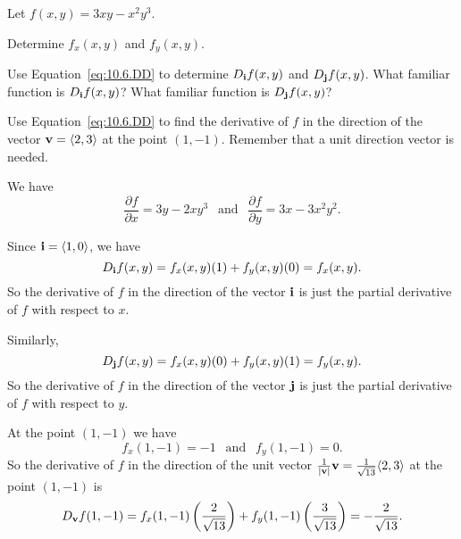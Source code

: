 \begin{activity} \label{A:10.6.2} Let $f(x,y) = 3xy-x^2y^3$.
	\ba
	
	\item Determine $f_x(x,y)$ and $f_y(x,y)$.
		
	\item Use Equation~\eqref{eq:10.6.DD} to determine $D_{\mathbf{i}} f(x,y)$ and $D_{\mathbf{j}} f(x,y)$. What familiar function is $D_{\mathbf{i}} f(x,y)$? What familiar function is $D_{\mathbf{j}} f(x,y)$?
	
	\item Use Equation~\eqref{eq:10.6.DD} to find the derivative of $f$ in the direction of the vector $\mathbf{v} = \langle 2, 3 \rangle$ at the point $(1,-1)$.  Remember that a unit direction vector is needed.
	
	
	
	\ea


\end{activity}
\begin{smallhint}

\end{smallhint}
\begin{bighint}

\end{bighint}
\begin{activitySolution}
\ba 
\item We have 
\[\frac{\partial f}{\partial x} = 3y-2xy^3 \ \ \text{ and } \ \ \frac{\partial f}{\partial y} = 3x - 3x^2y^2.\]

\item Since $\mathbf{i} = \langle 1, 0 \rangle$, we have 
\[D_{\mathbf{i}}f(x,y) = f_x(x,y)(1) + f_y(x,y)(0) = f_x(x,y).\]
So the derivative of $f$ in the direction of the vector $\mathbf{i}$ is just the partial derivative of $f$ with respect to $x$.

Similarly,
\[D_{\mathbf{j}}f(x,y) = f_x(x,y)(0) + f_y(x,y)(1) = f_y(x,y).\]
So the derivative of $f$ in the direction of the vector $\mathbf{j}$ is just the partial derivative of $f$ with respect to $y$.

\item At the point $(1,-1)$ we have 
\[f_x(1,-1) = -1 \ \ \text{ and } \ \ f_y(1,-1) = 0.\]
So the derivative of $f$ in the direction of the unit vector $\frac{1}{|\mathbf{v}|} \mathbf{v} = \frac{1}{\sqrt{13}}\langle 2, 3 \rangle$ at the point $(1,-1)$ is
\[D_{\mathbf{v}}f(1,-1) = f_x(1,-1) \left(\frac{2}{\sqrt{13}}\right) + f_y(1,-1) \left(\frac{3}{\sqrt{13}}\right) = -\frac{2}{\sqrt{13}}.\]

\ea
 
\end{activitySolution}
\aftera